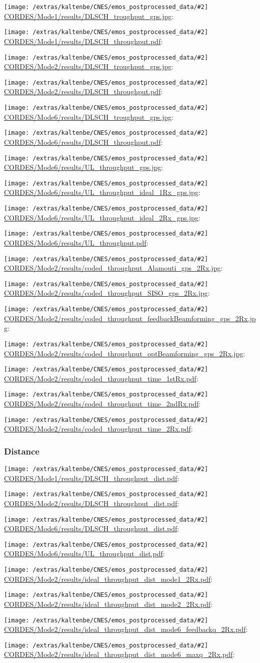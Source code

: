 \documentclass[a4paper,10pt]{article}
\newcommand{\printfile}[2][]{
 \begin{minipage}{8cm}
  \centering
  \texttt{[image: /extras/kaltenbe/CNES/emos\_postprocessed\_data/\#2]}
  \url{#2}: #1

 \end{minipage}
}
\begin{document}
\printfile{CORDES/Mode1/results/DLSCH_troughput_gps.jpg}
\printfile{CORDES/Mode1/results/DLSCH_throughput.pdf}

\printfile{CORDES/Mode2/results/DLSCH_troughput_gps.jpg}
\printfile{CORDES/Mode2/results/DLSCH_throughput.pdf}

\printfile{CORDES/Mode6/results/DLSCH_troughput_gps.jpg}
\printfile{CORDES/Mode6/results/DLSCH_throughput.pdf}

\printfile{CORDES/Mode6/results/UL_throughput_gps.jpg}
\printfile{CORDES/Mode6/results/UL_throughput_ideal_1Rx_gps.jpg}

\printfile{CORDES/Mode6/results/UL_throughput_ideal_2Rx_gps.jpg}
\printfile{CORDES/Mode6/results/UL_throughput.pdf}

\printfile{CORDES/Mode2/results/coded_throughput_Alamouti_gps_2Rx.jpg}
\printfile{CORDES/Mode2/results/coded_throughput_SISO_gps_2Rx.jpg}

\printfile{CORDES/Mode2/results/coded_throughput_feedbackBeamforming_gps_2Rx.jpg}
\printfile{CORDES/Mode2/results/coded_throughput_optBeamforming_gps_2Rx.jpg}

\printfile{CORDES/Mode2/results/coded_throughput_time_1stRx.pdf}
\printfile{CORDES/Mode2/results/coded_throughput_time_2ndRx.pdf}

\printfile{CORDES/Mode2/results/coded_throughput_time_2Rx.pdf}


\subsubsection{Distance}

\printfile{CORDES/Mode1/results/DLSCH_throughput_dist.pdf}
\printfile{CORDES/Mode2/results/DLSCH_throughput_dist.pdf}

\printfile{CORDES/Mode6/results/DLSCH_throughput_dist.pdf}
\printfile{CORDES/Mode6/results/UL_throughput_dist.pdf}


\printfile{CORDES/Mode2/results/ideal_throughput_dist_mode1_2Rx.pdf}
%
\printfile{CORDES/Mode2/results/ideal_throughput_dist_mode2_2Rx.pdf}

\printfile{CORDES/Mode2/results/ideal_throughput_dist_mode6_feedbackq_2Rx.pdf}
%
\printfile{CORDES/Mode2/results/ideal_throughput_dist_mode6_maxq_2Rx.pdf}
\end{document}

